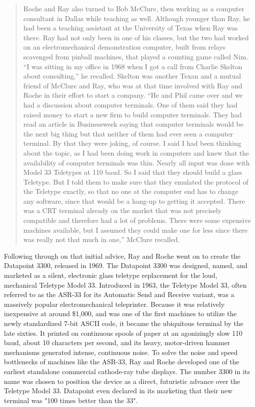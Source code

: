 \begin{quotation}
Roche and Ray also turned to Bob McClure, then working as a computer consultant in Dallas while teaching as well. Although younger than Ray, he had been a teaching assistant at the University of Texas when Ray was there. Ray had not only been in one of his classes, but the two had worked on an electromechanical demonstration computer, built from relays scavenged from pinball machines, that played a counting game called Nim. “I was sitting in my office in 1968 when I got a call from Charlie Skelton about consulting,” he recalled. Skelton was another Texan and a mutual friend of McClure and Ray, who was at that time involved with Ray and Roche in their effort to start a company. “He and Phil came over and we had a discussion about computer terminals. One of them said they had raised money to start a new firm to build computer terminals. They had read an article in Businessweek saying that computer terminals would be the next big thing but that neither of them had ever seen a computer terminal. By that they were joking, of course. I said I had been thinking about the topic, as I had been doing work in computers and knew that the availability of computer terminals was thin. Nearly all input was done with Model 33 Teletypes at 110 baud. So I said that they should build a glass Teletype. But I told them to make sure that they emulated the protocol of the Teletype exactly, so that no one at the computer end has to change any software, since that would be a hang-up to getting it accepted. There was a CRT terminal already on the market that was not precisely compatible and therefore had a lot of problems. There were some expensive machines available, but I assumed they could make one for less since there was really not that much in one,” McClure recalled. \cite{woodDatapointLostStory2012}
\end{quotation}

Following through on that initial advice, Ray and Roche went on to create the Datapoint 3300, released in 1969. The Datapoint 3300 was designed, named, and marketed as a silent, electronic glass teletype replacement for the loud, mechanical Teletype Model 33. Introduced in 1963, the Teletype Model 33, often referred to as the ASR-33 for its Automatic Send and Receive variant, was a massively popular electromechanical teleprinter. Because it was relatively inexpensive at around \$1,000, and was one of the first machines to utilize the newly standardized 7-bit ASCII code, it became the ubiquitous terminal by the late sixties. It printed on continuous spools of paper at an agonizingly slow 110 baud, about 10 characters per second, and its heavy, motor-driven hammer mechanisms generated intense, continuous noise. To solve the noise and speed bottlenecks of machines like the ASR-33, Ray and Roche developed one of the earliest standalone commercial cathode-ray tube displays. The number 3300 in its name was chosen to position the device as a direct, futuristic advance over the Teletype Model 33. Datapoint even declared in its marketing that their new terminal was "100 times better than the 33".

